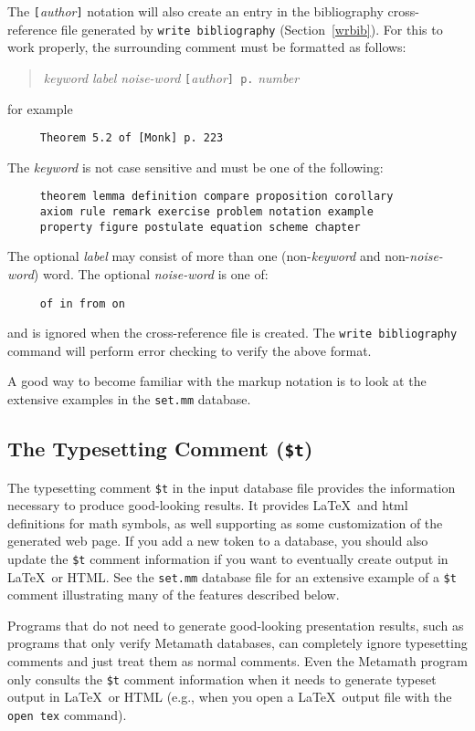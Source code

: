 The \texttt{[}{\em author}\texttt{]} notation will also create an entry in
the bibliography cross-reference file generated by \texttt{write
bibliography} (Section~\ref{wrbib}).  For this to work properly, the
surrounding comment must be formatted as follows:
\begin{quote}
    {\em keyword} {\em label} {\em noise-word}
     \texttt{[}{\em author}\texttt{] p.} {\em number}
\end{quote}
for example
\begin{verbatim}
     Theorem 5.2 of [Monk] p. 223
\end{verbatim}
The {\em keyword} is not case sensitive and must be one of the following:
\begin{verbatim}
     theorem lemma definition compare proposition corollary
     axiom rule remark exercise problem notation example
     property figure postulate equation scheme chapter
\end{verbatim}
The optional {\em label} may consist of more than one
(non-{\em keyword} and non-{\em noise-word}) word.
The optional {\em noise-word} is one of:
\begin{verbatim}
     of in from on
\end{verbatim}
and is  ignored when the cross-reference file is created.  The
\texttt{write
biblio\-graphy} command will perform error checking to verify the
above format.

A good way to become familiar with the markup notation is to look at
the extensive examples in the \texttt{set.mm} database.

\subsection{The Typesetting Comment (\texttt{\$t})}\label{tcomment}

The typesetting comment \texttt{\$t} in the input database file
provides the information necessary to produce good-looking results.
It provides \LaTeX\ and {\sc html}
definitions for math symbols,
as well supporting as some
customization of the generated web page.
If you add a new token to a database, you should also
update the \texttt{\$t} comment information if you want to eventually
create output in \LaTeX\ or {\sc HTML}.
See the
\texttt{set.mm} database
file for an extensive example of a \texttt{\$t} comment illustrating
many of the features described below.

Programs that do not need to generate good-looking presentation results,
such as programs that only verify Metamath databases,
can completely ignore typesetting comments
and just treat them as normal comments.
Even the Metamath program only consults the
\texttt{\$t} comment information when it needs to generate typeset output
in \LaTeX\ or {\sc HTML}
(e.g., when you open a \LaTeX\ output file with the \texttt{open tex} command).

